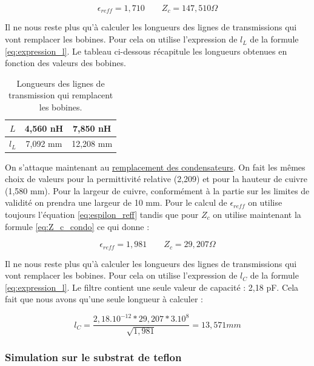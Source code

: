 \documentclass[french]{article}
\begin{document}
\begin{equation}
	\epsilon_{reff} = 1,710
	\qquad
	Z_c = 147,510 \Omega
\end{equation}

Il ne nous reste plus qu'à calculer les longueurs des lignes de transmissions qui vont remplacer les bobines. Pour cela on utilise l'expression de $l_L$ de la formule \ref{eq:expression_l}. Le tableau ci-dessous récapitule les longueurs obtenues en fonction des valeurs des bobines.


\begin{table}[H]
	\centering
	\begin{tabular}{|c|c|c|}
		\hline
		$L$ & 4,560 nH & 7,850 nH \\
		\hline
		$l_L$ & 7,092 mm & 12,208 mm\\
		\hline
	\end{tabular}
	\caption{Longueurs des lignes de transmission qui remplacent les bobines.}
	\label{tab:longueur_ligne_bobine_passe_bas}
\end{table}


On s'attaque maintenant au \underline{remplacement des condensateurs}. On fait les mêmes choix de valeurs pour la permittivité relative (2,209) et pour la hauteur de cuivre (1,580 mm). Pour la largeur de cuivre, conformément à la partie sur les limites de validité on prendra une largeur de 10 mm. Pour le calcul de $\epsilon_{reff}$ on utilise toujours l'équation \ref{eq:espilon_reff} tandis que pour $Z_c$ on utilise maintenant la formule \ref{eq:Z_c_condo} ce qui donne :

\begin{equation}
	\epsilon_{reff} = 1,981
	\qquad
	Z_c = 29,207 \Omega
\end{equation}

Il ne nous reste plus qu'à calculer les longueurs des lignes de transmissions qui vont remplacer les bobines. Pour cela on utilise l'expression de $l_C$ de la formule \ref{eq:expression_l}. Le filtre contient une seule valeur de capacité : 2,18 pF. Cela fait que nous avons qu'une seule longueur à calculer :

\begin{equation}
	l_C = \frac{2,18.10^{-12} * 29,207 * 3.10^8}{\sqrt{1,981}} = 13,571 mm
\end{equation}



\subsubsection{Simulation sur le substrat de teflon}
\end{document}
